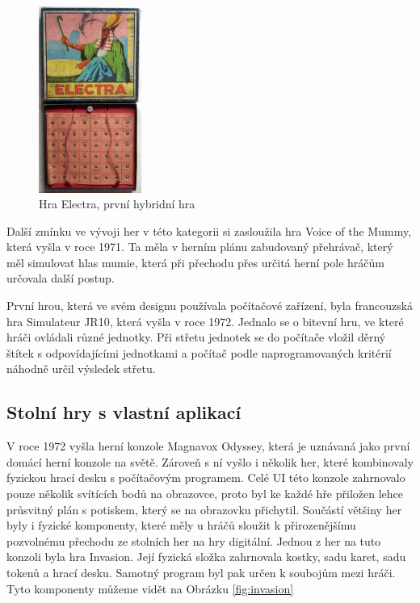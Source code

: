 \begin{figure}[H]
    \centering
    \includegraphics[width=0.3\textwidth]{resources/figures/electra.jpg}
    \caption{Hra Electra, první hybridní hra \cite{history_of_hybrid_games}}
    \label{fig:electra}
\end{figure}

Další zmínku ve vývoji her v této kategorii si zasloužila hra Voice of the Mummy, která vyšla v roce 1971. Ta měla v herním plánu zabudovaný přehrávač, který měl simulovat hlas mumie, která při přechodu přes určitá herní pole hráčům určovala další postup. \cite{voice_of_the_mummy}

První hrou, která ve svém designu používala počítačové zařízení, byla francouzská hra Simulateur JR10, která vyšla v roce 1972. Jednalo se o bitevní hru, ve které hráči ovládali různé jednotky. Při střetu jednotek se do počítače vložil děrný štítek s odpovídajícími jednotkami a počítač podle naprogramovaných kritérií náhodně určil výsledek střetu. \cite{simulateur_jr10}

\subsection{Stolní hry s vlastní aplikací}
V roce 1972 vyšla herní konzole Magnavox Odyssey, která je uznávaná jako první domácí herní konzole na světě. Zároveň s ní vyšlo i několik her, které kombinovaly fyzickou hrací desku s počítačovým programem. Celé UI této konzole zahrnovalo pouze několik svítících bodů na obrazovce, proto byl ke každé hře přiložen lehce průsvitný plán s potiskem, který se na obrazovku přichytil. Součástí většiny her byly i fyzické komponenty, které měly u hráčů sloužit k přirozenějšímu pozvolnému přechodu ze stolních her na hry digitální. \cite{magnavox_odyssey} Jednou z her na tuto konzoli byla hra Invasion. Její fyzická složka zahrnovala kostky, sadu karet, sadu tokenů a hrací desku. Samotný program byl pak určen k soubojům mezi hráči. Tyto komponenty můžeme vidět na Obrázku \ref{fig:invasion} \cite{invasion,invasion_gameplay}

